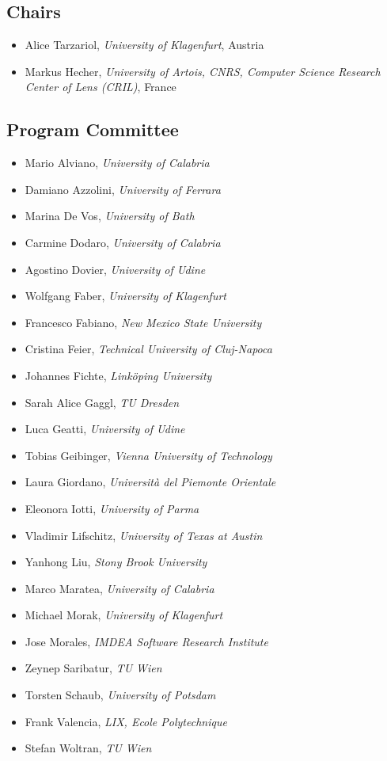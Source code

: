 \documentclass[
]{ceurart}
\begin{document}

\subsection*{Chairs}
\begin{itemize}
\item Alice Tarzariol, \emph{University of Klagenfurt}, Austria

\item Markus Hecher, \emph{University of Artois, CNRS, Computer Science Research Center of Lens (CRIL)}, France
\end{itemize}

\subsection*{Program Committee}
\begin{itemize}
\item Mario Alviano, \emph{University of Calabria}
\item Damiano Azzolini, \emph{University of Ferrara}
\item Marina De Vos, \emph{University of Bath}
\item Carmine Dodaro, \emph{University of Calabria}
\item Agostino Dovier, \emph{University of Udine}
\item Wolfgang Faber, \emph{University of Klagenfurt}
\item Francesco Fabiano, \emph{New Mexico State University}
\item Cristina Feier, \emph{Technical University of Cluj-Napoca}
\item Johannes Fichte, \emph{Linköping University}
\item Sarah Alice Gaggl, \emph{TU Dresden}
\item Luca Geatti, \emph{University of Udine}
\item Tobias Geibinger, \emph{Vienna University of Technology}
\item Laura Giordano, \emph{Università del Piemonte Orientale}
\item Eleonora Iotti, \emph{University of Parma}
\item Vladimir Lifschitz, \emph{University of Texas at Austin}
\item Yanhong Liu, \emph{Stony Brook University}
\item Marco Maratea, \emph{University of Calabria}
\item Michael Morak, \emph{University of Klagenfurt}
\item Jose Morales, \emph{IMDEA Software Research Institute}
\item Zeynep Saribatur, \emph{TU Wien}
\item Torsten Schaub, \emph{University of Potsdam}
\item Frank Valencia, \emph{LIX, Ecole Polytechnique}
\item Stefan Woltran, \emph{TU Wien}
\end{itemize}
\end{document}
